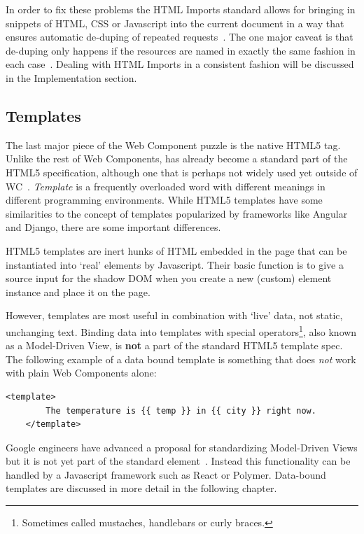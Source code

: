 In order to fix these problems the HTML Imports standard allows for bringing in snippets of HTML, CSS or Javascript into the current document in a way that ensures automatic de-duping of repeated requests~\cite{w3ccontributors2015-a}.
The one major caveat is that de-duping only happens if the resources are named in exactly the same fashion in each case~\cite{bidelman2013}.
Dealing with HTML Imports in a consistent fashion will be discussed in the Implementation section.

\subsection{Templates}
The last major piece of the Web Component puzzle is the native HTML5  tag. 
Unlike the rest of Web Components,  has already become a standard part of the HTML5 specification, 
although one that is perhaps not widely used yet outside of WC~\cite{w3ccontributors2015-c}.
\textit{Template} is a frequently overloaded word with different meanings in different programming environments.
While HTML5 templates have some similarities to the concept of templates popularized by frameworks like Angular and Django, there are some important differences.

HTML5 templates are inert hunks of HTML embedded in the page that can be instantiated into `real' elements by Javascript.
Their basic function is to give a source input for the shadow DOM when you create a new (custom) element instance and place it on the page.

However, templates are most useful in combination with `live' data, not static, unchanging text.
Binding data into templates with special operators\footnote{
Sometimes called mustaches, handlebars or curly braces. },
also known as a Model-Driven View,
is \textbf{not} a part of the standard HTML5 template spec.
The following example of a data bound template is something that does \textit{not} work with plain Web Components alone:

\begin{lstlisting}[language=HTML5,numbers=none]
	<template> 
		The temperature is {{ temp }} in {{ city }} right now.
	</template>
\end{lstlisting}

Google engineers have advanced a proposal for standardizing 
Model-Driven Views
but it is not yet part of the standard  element~\cite{googledevelopers2014}.
Instead this functionality can be handled by a Javascript framework such as React or Polymer.
Data-bound templates are discussed in more detail in the following chapter.


